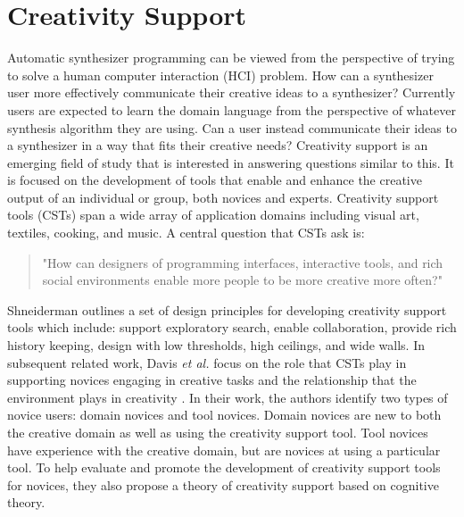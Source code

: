 

\section{Creativity Support}
Automatic synthesizer programming can be viewed from the perspective of trying to solve a human computer interaction (HCI) problem. How can a synthesizer user more effectively communicate their creative ideas to a synthesizer? Currently users are expected to learn the domain language from the perspective of whatever synthesis algorithm they are using. Can a user instead communicate their ideas to a synthesizer in a way that fits their creative needs? Creativity support is an emerging field of study that is interested in answering questions similar to this. It is focused on the development of tools that enable and enhance the creative output of an individual or group, both novices and experts. Creativity support tools (CSTs) \cite{shneiderman2007creativity} span a wide array of application domains including visual art, textiles, cooking, and music. A central question that CSTs ask is: 
\begin{quote}
    "How can designers of programming interfaces, interactive tools, and rich social environments enable more people to be more creative more often?"
\end{quote}


Shneiderman \cite{shneiderman2007creativity} outlines a set of design principles for developing creativity support tools which include: support exploratory search, enable collaboration, provide rich history keeping, design with low thresholds, high ceilings, and wide walls. In subsequent related work, Davis \textit{et al.} focus on the role that CSTs play in supporting novices engaging in creative tasks and the relationship that the environment plays in creativity \cite{davis2013toward}. In their work, the authors identify two types of novice users: domain novices and tool novices. Domain novices are new to both the creative domain as well as using the creativity support tool. Tool novices have experience with the creative domain, but are novices at using a particular tool. To help evaluate and promote the development of creativity support tools for novices, they also propose a theory of creativity support based on cognitive theory.


